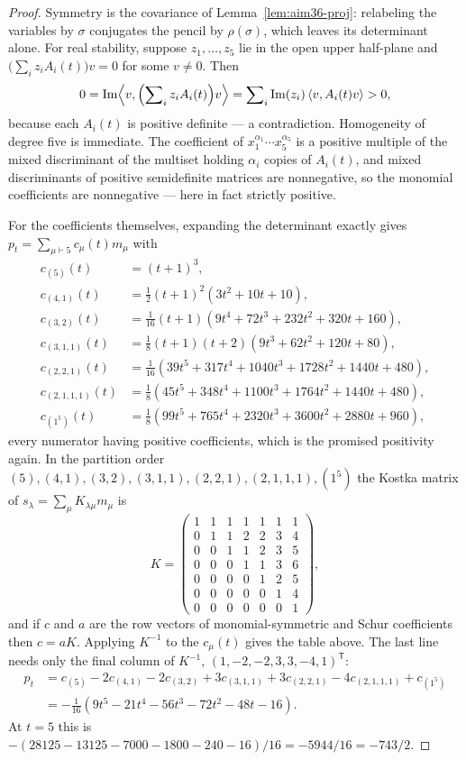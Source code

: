 \begin{proof}
Symmetry is the covariance of Lemma~\ref{lem:aim36-proj}: relabeling the variables
by $\sigma$ conjugates the pencil by $\rho(\sigma)$, which leaves its
determinant alone.  For real stability, suppose $z_1,\ldots,z_5$ lie in the open
upper half-plane and $\bigl(\sum_iz_iA_i(t)\bigr)v=0$ for some $v\ne0$.  Then
\[
0=\operatorname{Im}\Bigl\langle v,\Bigl(\sum\nolimits_iz_iA_i(t)\Bigr)v\Bigr\rangle
 =\sum\nolimits_i\operatorname{Im}(z_i)\,\langle v,A_i(t)v\rangle>0,
\]
because each $A_i(t)$ is positive definite --- a contradiction.  Homogeneity of
degree five is immediate.  The coefficient of $x_1^{\alpha_1}\cdots
x_5^{\alpha_5}$ is a positive multiple of the mixed discriminant of the multiset
holding $\alpha_i$ copies of $A_i(t)$, and mixed discriminants of positive
semidefinite matrices are nonnegative, so the monomial coefficients are
nonnegative --- here in fact strictly positive.

For the coefficients themselves, expanding the determinant exactly gives
$p_t=\sum_{\mu\vdash5}c_\mu(t)m_\mu$ with
\begin{align*}
c_{(5)}(t)&=(t+1)^3,\\
c_{(4,1)}(t)&=\tfrac12(t+1)^2(3t^2+10t+10),\\
c_{(3,2)}(t)&=\tfrac1{16}(t+1)(9t^4+72t^3+232t^2+320t+160),\\
c_{(3,1,1)}(t)&=\tfrac18(t+1)(t+2)(9t^3+62t^2+120t+80),\\
c_{(2,2,1)}(t)&=\tfrac1{16}(39t^5+317t^4+1040t^3+1728t^2+1440t+480),\\
c_{(2,1,1,1)}(t)&=\tfrac18(45t^5+348t^4+1100t^3+1764t^2+1440t+480),\\
c_{(1^5)}(t)&=\tfrac18(99t^5+765t^4+2320t^3+3600t^2+2880t+960),
\end{align*}
every numerator having positive coefficients, which is the promised positivity
again.  In the partition order
$(5),(4,1),(3,2),(3,1,1),(2,2,1),(2,1,1,1),(1^5)$ the Kostka matrix of
$s_\lambda=\sum_\mu K_{\lambda\mu}m_\mu$ is
\[
K=\begin{pmatrix}
1&1&1&1&1&1&1\\
0&1&1&2&2&3&4\\
0&0&1&1&2&3&5\\
0&0&0&1&1&3&6\\
0&0&0&0&1&2&5\\
0&0&0&0&0&1&4\\
0&0&0&0&0&0&1
\end{pmatrix},
\]
and if $c$ and $a$ are the row vectors of monomial-symmetric and Schur
coefficients then $c=aK$.  Applying $K^{-1}$ to the $c_\mu(t)$ gives the table
above.  The last line needs only the final column of $K^{-1}$,
$(1,-2,-2,3,3,-4,1)^{\mathsf T}$:
\begin{align*}
[s_{(1^5)}]p_t&=c_{(5)}-2c_{(4,1)}-2c_{(3,2)}+3c_{(3,1,1)}+3c_{(2,2,1)}
  -4c_{(2,1,1,1)}+c_{(1^5)}\\
&=-\tfrac1{16}(9t^5-21t^4-56t^3-72t^2-48t-16).
\end{align*}
At $t=5$ this is $-(28125-13125-7000-1800-240-16)/16=-5944/16=-743/2$.
\end{proof}


